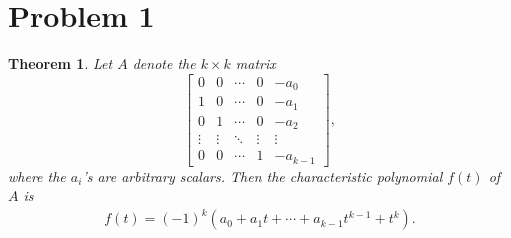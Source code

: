 \documentclass[10pt,a4paper]{article}
\author{Jeremiah Givens}
\newtheorem{theorem}{Theorem}
\theoremstyle{definition}
\begin{document}
\section*{Problem 1}
\begin{theorem}
Let $A$ denote the $k \times k$ matrix
\[\begin{bmatrix}
0 &0 &\cdots &0 &-a_0\\
1 &0 &\cdots &0 &-a_1\\
0 &1 &\cdots &0 &-a_2\\
\vdots &\vdots &\ddots &\vdots &\vdots\\
0 &0 &\cdots &1 &-a_{k-1}
\end{bmatrix},\]
where the $a_i$'s are arbitrary scalars. Then the characteristic polynomial $f(t)$ of $A$ is
\begin{align*}
f(t) = (-1)^k(a_0 + a_1t + \cdots +a_{k-1}t^{k-1} + t^k).
\end{align*}
\end{theorem}
\end{document}
